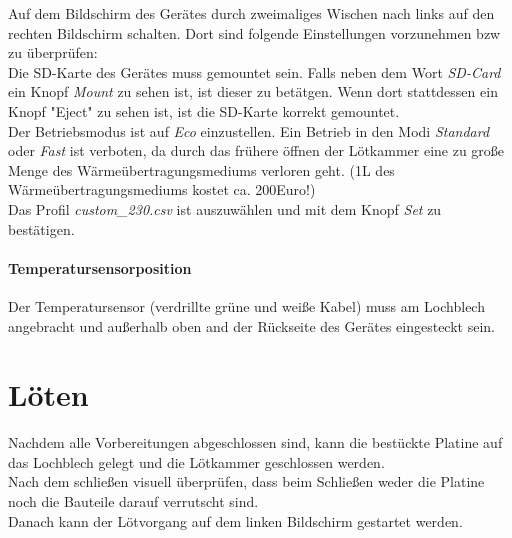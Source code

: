 \documentclass{\basedir/fablab-document}
\renewcommand{\todo}[1]{\textbf{\color{red}{TODO: #1}}}
\begin{document}
Auf dem Bildschirm des Ger{\"a}tes durch zweimaliges Wischen nach links auf den rechten Bildschirm schalten. Dort sind folgende Einstellungen vorzunehmen bzw zu {\"u}berpr{\"u}fen:\\

Die SD-Karte des Ger{\"a}tes muss gemountet sein. Falls neben dem Wort \textit{SD-Card} ein Knopf \textit{Mount} zu sehen ist, ist dieser zu bet{\"a}tgen. Wenn dort stattdessen ein Knopf "Eject" zu sehen ist, ist die SD-Karte korrekt gemountet.\\

Der Betriebsmodus ist auf \textit{Eco} einzustellen. Ein Betrieb in den Modi \textit{Standard} oder \textit{Fast} ist verboten, da durch das fr{\"u}here {\"o}ffnen der L{\"o}tkammer eine zu gro{\ss}e Menge des W{\"a}rme{\"u}bertragungsmediums verloren geht. (1L des W{\"a}rme{\"u}bertragungsmediums kostet ca. 200Euro!)\\

Das Profil \textit{custom\_230.csv} ist auszuw{\"a}hlen und mit dem Knopf \textit{Set} zu best{\"a}tigen.\\


\paragraph{Temperatursensorposition}

Der Temperatursensor (verdrillte gr{\"u}ne und wei{\ss}e Kabel) muss am Lochblech angebracht und au{\ss}erhalb oben and der R{\"u}ckseite des Ger{\"a}tes eingesteckt sein.


\section{L{\"o}ten}

Nachdem alle Vorbereitungen abgeschlossen sind, kann die best{\"u}ckte Platine auf das Lochblech gelegt und die L{\"o}tkammer geschlossen werden.\\

Nach dem schlie{\ss}en visuell {\"u}berpr{\"u}fen, dass beim Schlie{\ss}en weder die Platine noch die Bauteile darauf verrutscht sind.\\

Danach kann der L{\"o}tvorgang auf dem linken Bildschirm gestartet werden.\\
\end{document}

